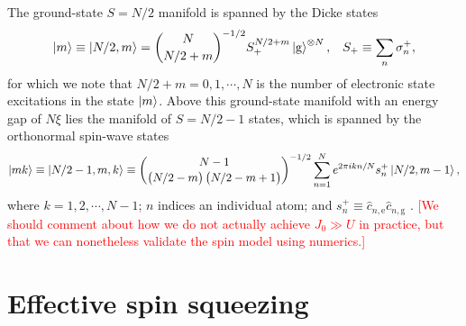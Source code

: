 \documentclass[aps,notitlepage,nofootinbib,11pt]{revtex4-1}
\newcommand{\p}[1]{\left(#1\right)} %
\newcommand{\g}{\text{g}} %
\newcommand{\e}{\text{e}}
\newcommand{\1}{\hat{\mathds{1}}}
\newcommand{\note}[1]{\textcolor{red}{#1}}
\begin{document}
The ground-state $S=N/2$ manifold is spanned by the Dicke states
\begin{align}
  \ket{m} \equiv \ket{N/2,m}
  = {N \choose N/2+m}^{-1/2} S_+^{N/2+m} \ket{\g}^{\otimes N},
  &&
  S_+ \equiv \sum_n \sigma_n^+,
\end{align}
for which we note that $N/2+m=0,1,\cdots,N$ is the number of
electronic state excitations in the state $\ket{m}$.  Above this
ground-state manifold with an energy gap of $N\xi$ lies the manifold
of $S=N/2-1$ states, which is spanned by the orthonormal spin-wave
states
\begin{align}
  \ket{mk}
  \equiv \ket{N/2-1,m,k}
  \equiv {N-1 \choose \p{N/2-m}\p{N/2-m+1}}^{-1/2}
  \sum_{n=1}^N e^{2\pi ikn/N} s_n^+ \ket{N/2,m-1},
\end{align}
where $k=1,2,\cdots,N-1$; $n$ indices an individual atom; and
$s_n^+\equiv\hat c_{n,\e}\hat c_{n,\g}$
\cite{swallows2011suppression}.  \note{[We should comment about how we
  do not actually achieve $J_0\gg U$ in practice, but that we can
  nonetheless validate the spin model using numerics.]}


\section{Effective spin squeezing}
\label{sec:OAT}
\end{document}
